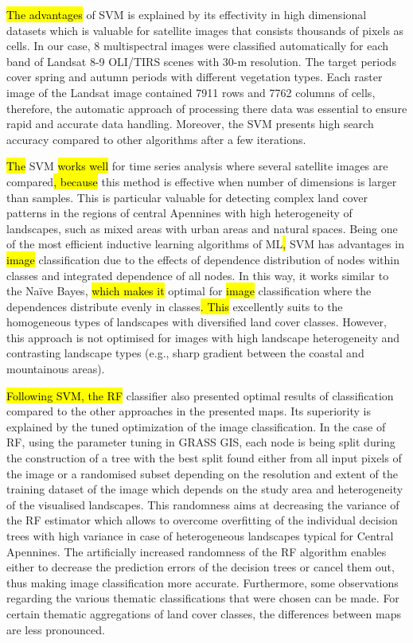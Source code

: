 \documentclass[jimaging,article,submit,pdftex,moreauthors]{Definitions/mdpi}
\begin{document}
\hl{The advantages} of SVM is explained by its effectivity in high dimensional datasets which is valuable for satellite images that consists thousands of pixels as cells. In our case, 8 multispectral images were classified automatically for each band of Landsat 8-9 OLI/TIRS scenes with 30-m resolution. The target periods cover spring and autumn periods with different vegetation types. Each raster image of the Landsat image contained 7911 rows and 7762 columns of cells, therefore, the automatic approach of processing there data was essential to ensure rapid and accurate data handling. Moreover, the SVM presents high search accuracy compared to other algorithms after a few iterations. 

\hl{The }SVM \hl{works well } for time series analysis where several satellite images are compared\hl{, because} this method is effective when number of dimensions is larger than samples. This is particular valuable for detecting complex land cover patterns in the regions of central Apennines with high heterogeneity of landscapes, such as mixed areas with urban areas and natural spaces. Being one of the most efficient inductive learning algorithms of ML\hl{, }SVM has advantages in \hl{image} classification\hl{ }due to the effects of dependence distribution of nodes within classes and integrated dependence of all nodes. In this way, it works similar to the Naïve Bayes, \hl{which makes it} optimal for \hl{image }classification where the dependences distribute evenly in classes\hl{. This} excellently suits to the homogeneous types of landscapes with diversified land cover classes. However, this approach is not optimised for images with high landscape heterogeneity and contrasting landscape types (e.g., sharp gradient between the coastal and mountainous areas). 

\hl{Following SVM, the RF} classifier also presented optimal results of classification compared to the other approaches in the presented maps. Its superiority is explained by the tuned optimization of the image classification. In the case of RF, using the parameter tuning in GRASS GIS, each node is being split during the construction of a tree with the best split found either from all input pixels of the image or a randomised subset depending on the resolution and extent of the training dataset of the image which depends on the study area and heterogeneity of the visualised landscapes. This randomness aims at decreasing the variance of the RF estimator which allows to overcome overfitting of the individual decision trees with high variance in case of heterogeneous landscapes typical for Central Apennines. The artificially increased randomness of the RF algorithm enables either to decrease the prediction errors of the decision trees or cancel them out, thus making image classification more accurate. Furthermore, some observations regarding the various thematic classifications that were chosen can be made. For certain thematic aggregations of land cover classes, the differences between maps are less pronounced.
\end{document}
